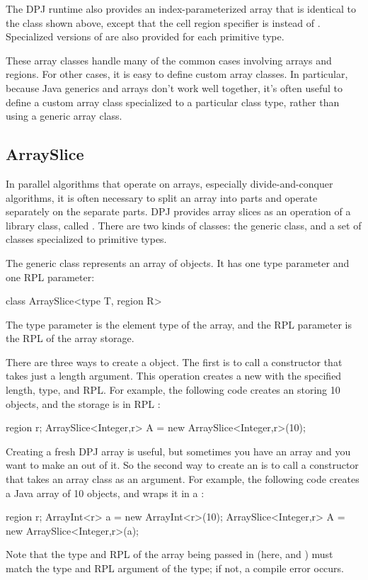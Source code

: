 The DPJ runtime also provides an index-parameterized array
 that is identical to the  class shown above,
except that the cell region specifier is  instead of
.  Specialized versions of  are also provided for
each primitive type.

These array classes handle many of the common cases involving arrays
and regions.  For other cases, it is easy to define custom array
classes.  In particular, because Java generics and arrays don't work
well together, it's often useful to define a custom array class
specialized to a particular class type, rather than using a generic
array class.

\subsection{ArraySlice%
\label{sec:runtime:array-slice}}

In parallel algorithms that operate on arrays, especially
divide-and-conquer algorithms, it is often necessary to split an array
into parts and operate separately on the separate parts.  DPJ provides
array slices as an operation of a library class, called
.  There are two kinds of  classes:
the generic  class, and a set of 
classes specialized to primitive types.

 The generic  class
represents an array of objects.  It has one type parameter and one RPL
parameter:
%
\begin{dpjlisting}
class ArraySlice<type T, region R>
\end{dpjlisting}
%
The type parameter is the element type of the array, and the RPL
parameter is the RPL of the array storage.

 There are three ways to create a
 object.  The first is to call a constructor that
takes just a length argument.  This operation creates a new
 with the specified length, type, and RPL.  For
example, the following code creates an  storing 10
 objects, and the storage is in RPL :
%
\begin{dpjlisting}
region r;
ArraySlice<Integer,r> A = new ArraySlice<Integer,r>(10);
\end{dpjlisting}
%

Creating a fresh DPJ array is useful, but sometimes you have an array
and you want to make an  out of it.  So the second way
to create an  is to call a constructor that takes an
array class as an argument.  For example, the following code creates a
Java array of 10  objects, and wraps it in a
:
%
\begin{dpjlisting}
region r;
ArrayInt<r> a = new ArrayInt<r>(10);
ArraySlice<Integer,r> A = new ArraySlice<Integer,r>(a);
\end{dpjlisting}
%
Note that the type and RPL of the array being passed in (here,
 and ) must match the type and RPL argument of the
 type; if not, a compile error occurs.

